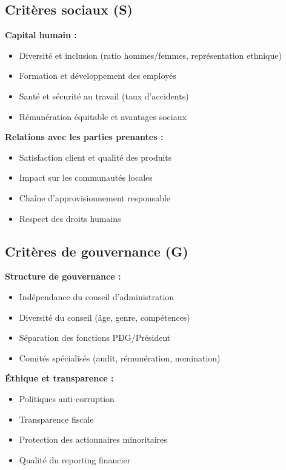 \begin{table}[h]
\begin{table}[h]
\begin{table}[h]
\begin{table}[h]
\begin{table}[h]
\subsection{Critères sociaux (S)}

\textbf{Capital humain :}
\begin{itemize}
\item Diversité et inclusion (ratio hommes/femmes, représentation ethnique)
\item Formation et développement des employés
\item Santé et sécurité au travail (taux d'accidents)
\item Rémunération équitable et avantages sociaux
\end{itemize}

\textbf{Relations avec les parties prenantes :}
\begin{itemize}
\item Satisfaction client et qualité des produits
\item Impact sur les communautés locales
\item Chaîne d'approvisionnement responsable
\item Respect des droits humains
\end{itemize}

\subsection{Critères de gouvernance (G)}

\textbf{Structure de gouvernance :}
\begin{itemize}
\item Indépendance du conseil d'administration
\item Diversité du conseil (âge, genre, compétences)
\item Séparation des fonctions PDG/Président
\item Comités spécialisés (audit, rémunération, nomination)
\end{itemize}

\textbf{Éthique et transparence :}
\begin{itemize}
\item Politiques anti-corruption
\item Transparence fiscale
\item Protection des actionnaires minoritaires
\item Qualité du reporting financier
\end{itemize}


\end{table}
\end{table}
\end{table}
\end{table}
\end{table}
